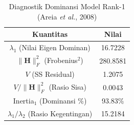 \begin{table}[H]
\centering
\small
\caption{Diagnostik Dominansi Model Rank-1 (Areia \textit{et al.}, 2008)} \label{tab:sample2struktur_diagnostik}
\begin{tabular}{|c|c|}
\hline
\textbf{Kuantitas} & \textbf{Nilai} \\
\hline
$\lambda_1$ (Nilai Eigen Dominan) & 16.7228 \\
$\|\mathbf{H}\|_F^2$ (Frobenius$^2$) & 280.8581 \\
$V$ (SS Residual) & 1.2075 \\
$V / \|\mathbf{H}\|_F^2$ (Rasio Sisa) & 0.0043 \\
Inertia$_1$ (Dominansi \%) & 93.83\% \\
$\lambda_1 / \lambda_2$ (Rasio Kegentingan) & 15.2184 \\
\hline
\end{tabular}
\end{table}